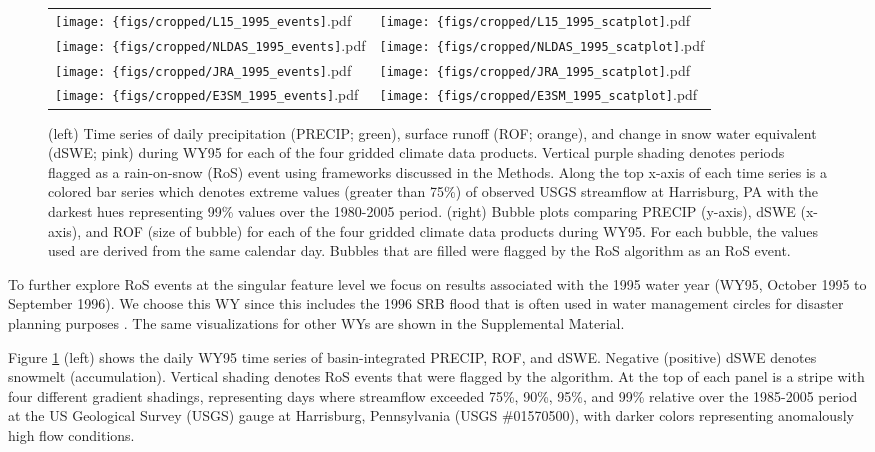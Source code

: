 \documentclass[draft]{agujournal2019}
\begin{document}
\begin{figure}
\centering
\begin{tabularx}{\textwidth}{XX}
\texttt{[image: \{figs/cropped/L15\_1995\_events]}.pdf} & \texttt{[image: \{figs/cropped/L15\_1995\_scatplot]}.pdf} \\ \texttt{[image: \{figs/cropped/NLDAS\_1995\_events]}.pdf} & \texttt{[image: \{figs/cropped/NLDAS\_1995\_scatplot]}.pdf} \\
    \texttt{[image: \{figs/cropped/JRA\_1995\_events]}.pdf} & \texttt{[image: \{figs/cropped/JRA\_1995\_scatplot]}.pdf} \\\texttt{[image: \{figs/cropped/E3SM\_1995\_events]}.pdf} & \texttt{[image: \{figs/cropped/E3SM\_1995\_scatplot]}.pdf}
\end{tabularx}
\caption{(left) Time series of daily precipitation (PRECIP; green), surface runoff (ROF; orange), and change in snow water equivalent (dSWE; pink) during WY95 for each of the four gridded climate data products. Vertical purple shading denotes periods flagged as a rain-on-snow (RoS) event using frameworks discussed in the Methods. Along the top x-axis of each time series is a colored bar series which denotes extreme values (greater than 75\%) of observed USGS streamflow at Harrisburg, PA with the darkest hues representing 99\% values over the 1980-2005 period. (right) Bubble plots comparing PRECIP (y-axis), dSWE (x-axis), and ROF (size of bubble) for each of the four gridded climate data products during WY95. For each bubble, the values used are derived from the same calendar day. Bubbles that are filled were flagged by the RoS algorithm as an RoS event.}
\label{fig:merged-wy}
\end{figure}

To further explore RoS events at the singular feature level we focus on results associated with the 1995 water year (WY95, October 1995 to September 1996). We choose this WY since this includes the 1996 SRB flood that is often used in water management circles for disaster planning purposes \citep{leathers1998severe}. 
The same visualizations for other WYs are shown in the Supplemental Material.

Figure \ref{fig:merged-wy} (left) shows the daily WY95 time series of basin-integrated PRECIP, ROF, and dSWE.
Negative (positive) dSWE denotes snowmelt (accumulation). 
Vertical shading denotes RoS events that were flagged by the algorithm. 
At the top of each panel is a stripe with four different gradient shadings, representing days where streamflow exceeded 75\%, 90\%, 95\%, and 99\% relative over the 1985-2005 period at the US Geological Survey (USGS) gauge at Harrisburg, Pennsylvania (USGS \#01570500), with darker colors representing anomalously high flow conditions.
\end{document}
